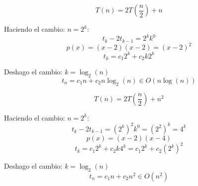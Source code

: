 \begin{ejemplo}
\begin{equation*}
    T(n) = 2T\left(\dfrac{n}{2}\right) + n
\end{equation*}

Haciendo el cambio: $n = 2^k$:
\begin{equation*}
    t_k - 2t_{k-1} = 2^k k^0
\end{equation*}
\begin{equation*}
    p(x) = (x-2)(x-2) = (x-2)^2
\end{equation*}
\begin{equation*}
    t_k = c_1 2^k + c_2 k 2^k
\end{equation*}

Deshago el cambio: $k = \log_2(n)$
\begin{equation*}
    t_n = c_1 n + c_2 n\log_2(n) \in O(n\log(n))
\end{equation*} 
\end{ejemplo}

\begin{ejemplo}
\begin{equation*}
    T(n) = 2T\left(\dfrac{n}{2}\right) + n^2
\end{equation*}

Haciendo el cambio: $n = 2^k$:
\begin{equation*}
    t_k - 2t_{k-1} = (2^k)^2 k^0 = (2^2)^k = 4^k
\end{equation*}
\begin{equation*}
    p(x) = (x-2)(x-4)
\end{equation*}
\begin{equation*}
    t_k = c_1 2^k + c_2 k 4^k = c_1 2^k + c_2 (2^k)^2
\end{equation*}

Deshago el cambio: $k = \log_2(n)$
\begin{equation*}
    t_n = c_1 n + c_2 n^2 \in O(n^2)
\end{equation*} 
\end{ejemplo}

